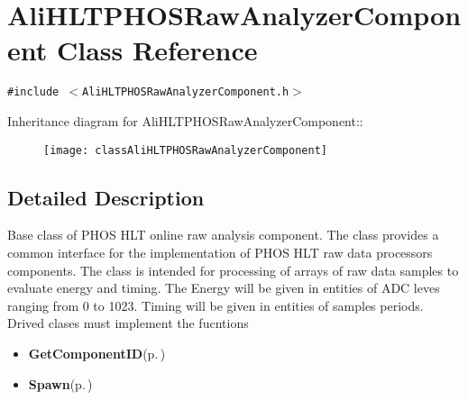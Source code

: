 \section{Ali\-HLTPHOSRaw\-Analyzer\-Component Class Reference}
\label{classAliHLTPHOSRawAnalyzerComponent}
{\tt \#include $<$Ali\-HLTPHOSRaw\-Analyzer\-Component.h$>$}

Inheritance diagram for Ali\-HLTPHOSRaw\-Analyzer\-Component::\begin{figure}[H]
\begin{center}
\leavevmode
\texttt{[image: classAliHLTPHOSRawAnalyzerComponent]}
\end{center}
\end{figure}


\subsection{Detailed Description}
Base class of PHOS HLT online raw analysis component. The class provides a common interface for the implementation of PHOS HLT raw data processors components. The class is intended for processing of arrays of raw data samples to evaluate energy and timing. The Energy will be given in entities of ADC leves ranging from 0 to 1023. Timing will be given in entities of samples periods. Drived clases must implement the fucntions\begin{itemize}
\item {\bf Get\-Component\-ID}{\rm (p.\,\pageref{classAliHLTPHOSRawAnalyzerComponent_a12})}\item {\bf Spawn}{\rm (p.\,\pageref{classAliHLTPHOSRawAnalyzerComponent_a16})} \end{itemize}




